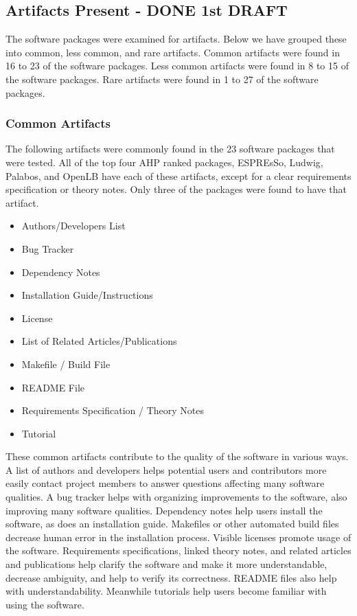 \documentclass[12pt, notitlepage]{article}
\begin{document}
\subsection{Artifacts Present - DONE 1st DRAFT}

The software packages were examined for artifacts. Below we have grouped these into common, less common, and rare artifacts. Common artifacts were found in 16 to 23 of the software packages. Less common artifacts were found in 8 to 15 of the software packages. Rare artifacts were found in 1 to 27 of the software packages. 

\subsubsection{Common Artifacts}
The following artifacts were commonly found in the 23 software packages that were tested. All of the top four AHP ranked packages, ESPREsSo, Ludwig, Palabos, and OpenLB have each of these artifacts, except for a clear requirements specification or theory notes. Only three of the packages were found to have that artifact. 

\begin{singlespace}
\begin{multicols}{2}	
\begin{itemize}
	\item Authors/Developers List
	\item Bug Tracker
	\item Dependency Notes 
	\item Installation Guide/Instructions 
	\item License
	\item List of Related Articles/Publications 
	\item Makefile / Build File 
	\item README File 
	\item Requirements Specification / Theory Notes
	\item Tutorial
\end{itemize}
\end{multicols}
\end{singlespace}

These common artifacts contribute to the quality of the software in various ways. A list of authors and developers helps potential users and contributors more easily contact project members to answer questions affecting many software qualities. A bug tracker helps with organizing improvements to the software, also improving many software qualities. Dependency notes help users install the software, as does an installation guide. Makefiles or other automated build files decrease human error in the installation process. Visible licenses promote usage of the software. Requirements specifications, linked theory notes, and related articles and publications help clarify the software and make it more understandable, decrease ambiguity, and help to verify its correctness. README files also help with understandability. Meanwhile tutorials help users become familiar with using the software.
\end{document}
